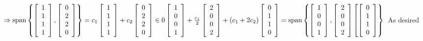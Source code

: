 \documentclass[11pt]{article}
\begin{document}
\begin{enumerate}[{\bf Q1.}]
\begin{enumerate}
			$\Rightarrow \operatorname{span}\left\{\left[\begin{array}{l}1 \\ 1 \\ 1 \\ 1\end{array}\right],\left[\begin{array}{l}0 \\ 2 \\ 2 \\ 0\end{array}\right]\right\}=c_1\left[\begin{array}{l}1 \\ 1 \\ 1 \\ 1\end{array}\right]+c_2\left[\begin{array}{l}0 \\ 2 \\ 2 \\ 0\end{array}\right] \in 0\left[\begin{array}{l}1 \\ 0 \\ 0 \\ 1\end{array}\right]+\frac{c_1}{2}\left[\begin{array}{l}2 \\ 0 \\ 0 \\ 2\end{array}\right]+\left(c_1+2 c_2\right)\left[\begin{array}{l}0 \\ 1 \\ 1 \\ 0\end{array} \newline
			\right]=\operatorname{span}\left\{\left[\begin{array}{c}1 \\ 0 \\ 0 \\ 1\end{array}\right],\left[\begin{array}{c}2 \\ 0 \\ 0 \\ 2\end{array}\right]\left[\left[\begin{array}{l}0 \\ 1 \\ 1\\ 0\end{array}\right]\right\}\right.$ As desired \newline

\end{enumerate}
\end{enumerate}
\end{document}
